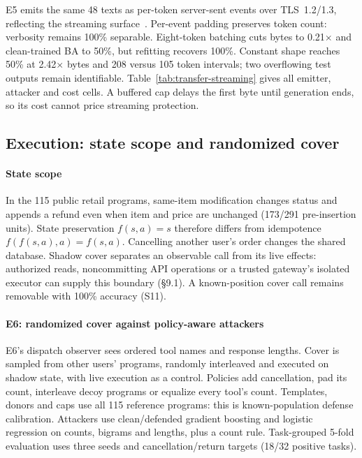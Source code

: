 E5 emits the same 48 texts as per-token server-sent events over TLS~1.2/1.3, reflecting the streaming surface~\cite{weiss2024prompt,whisperleak2025}. Per-event padding preserves token count: verbosity remains 100\% separable. Eight-token batching cuts bytes to 0.21$\times$ and clean-trained BA to 50\%, but refitting recovers 100\%. Constant shape reaches 50\% at 2.42$\times$ bytes and 208 versus 105 token intervals; two overflowing test outputs remain identifiable. Table~\ref{tab:transfer-streaming} gives all emitter, attacker and cost cells. A buffered cap delays the first byte until generation ends, so its cost cannot price streaming protection.



\subsection{Execution: state scope and randomized cover}
\paragraph{State scope}
In the 115 public retail programs, same-item modification changes status and appends a refund even when item and price are unchanged (173/291 pre-insertion units). State preservation $f(s,a)=s$ therefore differs from idempotence $f(f(s,a),a)=f(s,a)$. Cancelling another user's order changes the shared database. Shadow cover separates an observable call from its live effects: authorized reads, noncommitting API operations or a trusted gateway's isolated executor can supply this boundary (\S9.1). A known-position cover call remains removable with 100\% accuracy (S11).

\paragraph{E6: randomized cover against policy-aware attackers}
E6's dispatch observer sees ordered tool names and response lengths. Cover is sampled from other users' programs, randomly interleaved and executed on shadow state, with live execution as a control. Policies add cancellation, pad its count, interleave decoy programs or equalize every tool's count. Templates, donors and caps use all 115 reference programs: this is known-population defense calibration. Attackers use clean/defended gradient boosting and logistic regression on counts, bigrams and lengths, plus a count rule. Task-grouped 5-fold evaluation uses three seeds and cancellation/return targets (18/32 positive tasks).

